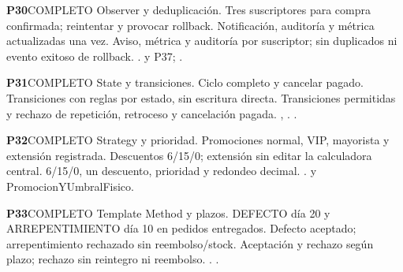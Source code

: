 \par\medskip\noindent\begin{minipage}{\linewidth}
\noindent\textbf{\large P30}\quad\textsf{COMPLETO}
 Observer y deduplicación.
 Tres suscriptores para compra confirmada; reintentar y provocar rollback.
 Notificación, auditoría y métrica actualizadas una vez.
 Aviso, métrica y auditoría por suscriptor; sin duplicados ni evento exitoso de rollback.
 .  y P37; .
\end{minipage}\par
\par\medskip\noindent\begin{minipage}{\linewidth}
\noindent\textbf{\large P31}\quad\textsf{COMPLETO}
 State y transiciones.
 Ciclo completo y cancelar pagado.
 Transiciones con reglas por estado, sin escritura directa.
 Transiciones permitidas y rechazo de repetición, retroceso y cancelación pagada.
 , . .
\end{minipage}\par
\par\medskip\noindent\begin{minipage}{\linewidth}
\noindent\textbf{\large P32}\quad\textsf{COMPLETO}
 Strategy y prioridad.
 Promociones normal, VIP, mayorista y extensión registrada.
 Descuentos 6/15/0; extensión sin editar la calculadora central.
 6/15/0, un descuento, prioridad y redondeo decimal.
 .  y PromocionYUmbralFisico.
\end{minipage}\par
\par\medskip\noindent\begin{minipage}{\linewidth}
\noindent\textbf{\large P33}\quad\textsf{COMPLETO}
 Template Method y plazos.
 DEFECTO día 20 y ARREPENTIMIENTO día 10 en pedidos entregados.
 Defecto aceptado; arrepentimiento rechazado sin reembolso/stock.
 Aceptación y rechazo según plazo; rechazo sin reintegro ni reembolso.
 . .
\end{minipage}\par
